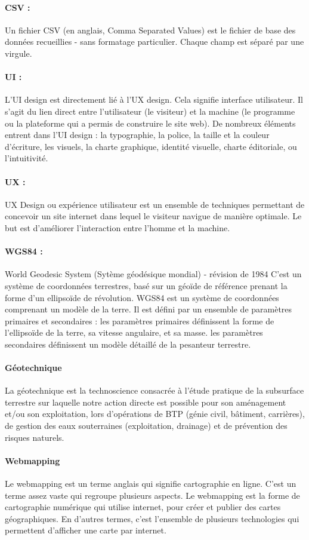 \paragraph{CSV :}
Un fichier CSV (en anglais, Comma Separated Values) est le fichier de 
base des données recueillies - sans formatage particulier. Chaque 
champ est séparé par une virgule.

\paragraph{UI :}
L’UI design est directement lié à l’UX design. Cela signifie interface 
utilisateur. Il s’agit du lien direct entre l’utilisateur (le visiteur) 
et la machine (le programme ou la plateforme qui a permis de construire 
le site web). De nombreux éléments entrent dans l’UI design : la typographie, la police, la taille et la 
couleur d’écriture, les visuels, la charte graphique, identité visuelle, 
charte éditoriale, ou l’intuitivité.

\paragraph{UX :}
UX Design ou expérience utilisateur est un ensemble de techniques 
permettant de concevoir un site internet dans lequel le visiteur navigue 
de manière optimale. Le but est d’améliorer l’interaction entre l’homme 
et la machine. 

\paragraph{WGS84 :}
World Geodesic System (Sytème géodésique mondial) - révision de 1984
C'est un système de coordonnées terrestres, basé sur un géoïde de référence 
prenant la forme d'un ellipsoïde de révolution.
WGS84 est un système de coordonnées comprenant un modèle de la terre. Il est 
défini par un ensemble de paramètres primaires et secondaires :
les paramètres primaires définissent la forme de l'ellipsoïde de la terre, sa vitesse angulaire, et sa masse.
les paramètres secondaires définissent un modèle détaillé de la pesanteur terrestre.

\paragraph{Géotechnique}
La géotechnique est la technoscience consacrée à l’étude pratique de la 
subsurface terrestre sur laquelle notre action directe est possible pour 
son aménagement et/ou son exploitation, lors d’opérations de BTP (génie 
civil, bâtiment, carrières), de gestion des eaux souterraines (exploitation, 
drainage) et de prévention des risques naturels.

\paragraph{Webmapping}
Le webmapping est un terme anglais qui signifie cartographie en ligne. 
C’est un terme assez vaste qui regroupe plusieurs aspects. Le webmapping est la 
forme de cartographie numérique qui utilise internet, pour créer et publier 
des cartes géographiques. En d’autres termes, c’est l’ensemble de plusieurs 
technologies qui permettent d’afficher une carte par internet.